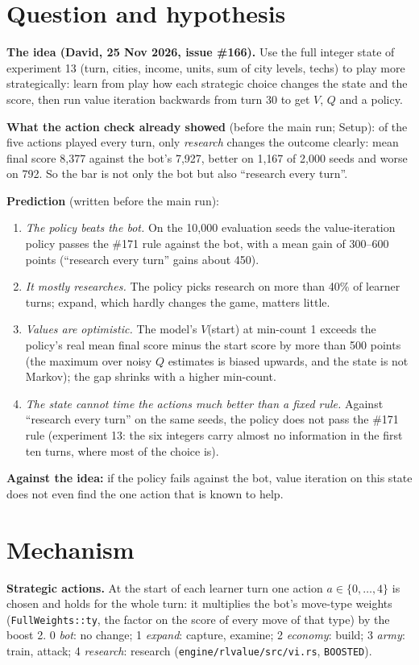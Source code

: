 \documentclass{../polyexp}
\begin{document}

\ExpHeader

\section{Question and hypothesis}
\textbf{The idea (David, 25 Nov 2026, issue \#166).} Use the full integer state of experiment 13 (turn, cities,
income, units, sum of city levels, techs) to play more strategically: learn from play how each strategic choice
changes the state and the score, then run value iteration backwards from turn 30 to get $V$, $Q$ and a policy.

\textbf{What the action check already showed} (before the main run; Setup): of the five actions played every
turn, only \emph{research} changes the outcome clearly: mean final score 8{,}377 against the bot's 7{,}927, better
on 1{,}167 of 2{,}000 seeds and worse on 792. So the bar is not only the bot but also ``research every turn''.

\textbf{Prediction} (written before the main run):
\begin{enumerate}
  \item \emph{The policy beats the bot.} On the 10{,}000 evaluation seeds the value-iteration policy passes the
        \#171 rule against the bot, with a mean gain of 300--600 points (``research every turn'' gains about 450).
  \item \emph{It mostly researches.} The policy picks research on more than 40\% of learner turns; expand, which
        hardly changes the game, matters little.
  \item \emph{Values are optimistic.} The model's $V$(start) at min-count 1 exceeds the policy's real mean final
        score minus the start score by more than 500 points (the maximum over noisy $Q$ estimates is biased
        upwards, and the state is not Markov); the gap shrinks with a higher min-count.
  \item \emph{The state cannot time the actions much better than a fixed rule.} Against ``research every turn''
        on the same seeds, the policy does not pass the \#171 rule (experiment 13: the six integers carry almost
        no information in the first ten turns, where most of the choice is).
\end{enumerate}
\textbf{Against the idea:} if the policy fails against the bot, value iteration on this state does not even find
the one action that is known to help.

\section{Mechanism}
\textbf{Strategic actions.} At the start of each learner turn one action $a \in \{0,\dots,4\}$ is chosen and holds
for the whole turn: it multiplies the bot's move-type weights (\texttt{FullWeights::ty}, the factor on the score of
every move of that type) by the boost 2. 0 \emph{bot}: no change; 1 \emph{expand}: capture, examine;
2 \emph{economy}: build; 3 \emph{army}: train, attack; 4 \emph{research}: research
(\texttt{engine/rlvalue/src/vi.rs}, \texttt{BOOSTED}).
\end{document}
